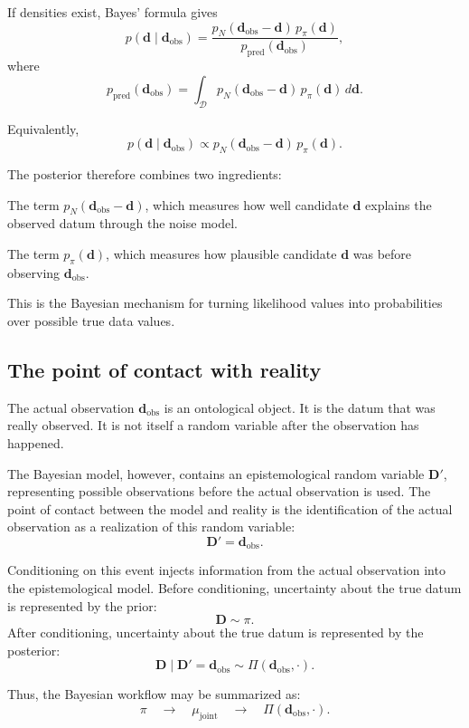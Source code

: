 \documentclass[11pt]{article}
\newcommand{\Dspace}{\mathcal D}
\newcommand{\prior}{\pi}
\newcommand{\Drand}{\mathbf D}
\newcommand{\Dobsrand}{\mathbf D'}
\newcommand{\dobs}{\mathbf d_{\mathrm{obs}}}
\begin{document}
If densities exist, Bayes' formula gives
\[
    p(\mathbf d\mid \dobs)
    =
    \frac{
        p_N(\dobs-\mathbf d)\,p_{\prior}(\mathbf d)
    }{
        p_{\mathrm{pred}}(\dobs)
    },
\]
where
\[
    p_{\mathrm{pred}}(\dobs)
    =
    \int_{\Dspace}
        p_N(\dobs-\mathbf d)\,
        p_{\prior}(\mathbf d)
    \,d\mathbf d.
\]

Equivalently,
\[
    p(\mathbf d\mid \dobs)
    \propto
    p_N(\dobs-\mathbf d)\,p_{\prior}(\mathbf d).
\]

The posterior therefore combines two ingredients:
\begin{description}[leftmargin=2.8cm,style=nextline]
    \item[Data fit.]
    The term \(p_N(\dobs-\mathbf d)\), which measures how well candidate \(\mathbf d\) explains the observed datum through the noise model.

    \item[Prior weight.]
    The term \(p_{\prior}(\mathbf d)\), which measures how plausible candidate \(\mathbf d\) was before observing \(\dobs\).
\end{description}

This is the Bayesian mechanism for turning likelihood values into probabilities over possible true data values.

\subsection{The point of contact with reality}

The actual observation \(\dobs\) is an ontological object. It is the datum that was really observed. It is not itself a random variable after the observation has happened.

The Bayesian model, however, contains an epistemological random variable \(\Dobsrand\), representing possible observations before the actual observation is used. The point of contact between the model and reality is the identification of the actual observation as a realization of this random variable:
\[
    \Dobsrand=\dobs.
\]

Conditioning on this event injects information from the actual observation into the epistemological model. Before conditioning, uncertainty about the true datum is represented by the prior:
\[
    \Drand\sim\prior.
\]
After conditioning, uncertainty about the true datum is represented by the posterior:
\[
    \Drand\mid \Dobsrand=\dobs
    \sim
    \Pi(\dobs,\cdot).
\]

Thus, the Bayesian workflow may be summarized as:
\[
    \prior
    \quad
    \longrightarrow
    \quad
    \mu_{\mathrm{joint}}
    \quad
    \longrightarrow
    \quad
    \Pi(\dobs,\cdot).
\]
\end{document}
